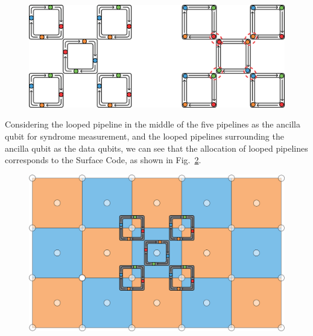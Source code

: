 \documentclass[a4paper,11pt]{ltjsarticle}
\begin{document}
{{        \begin{figure}[h]
            \centering
            \includegraphics[scale=0.30]{figure/looped_pipeline_surface_code.eps}
            \vspace{0pt}\caption{}
            \label{looped_pipeline_surface_code}
            \vspace{-10pt}
        \end{figure}

        Considering the looped pipeline in the middle of the five pipelines as the ancilla qubit for syndrome measurement, and the looped pipelines surrounding the ancilla qubit as the data qubits, we can see that the allocation of looped pipelines corresponds to the Surface Code, as shown in Fig.~\ref{looped_pipeline_weak_surface_code}.
        \clearpage
        \begin{figure}[h]
            \centering
            \includegraphics[scale=0.20]{figure/looped_pipeline_weak_surface_code.eps}
            \vspace{0pt}\caption{}
            \label{looped_pipeline_weak_surface_code}
            \vspace{-10pt}
        \end{figure} 

}}
\end{document}
